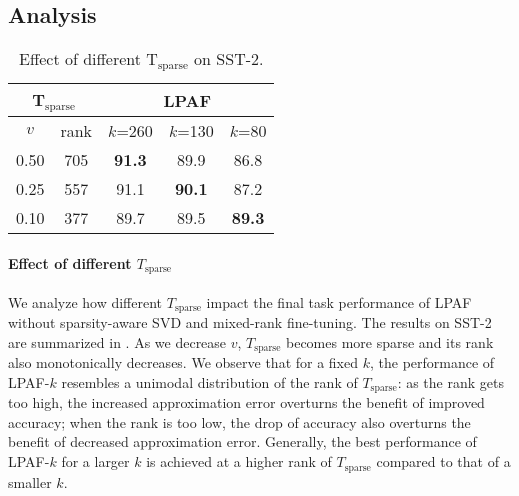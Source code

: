 \subsection{Analysis}
\label{sec:analysis}


\begin{table}[t]
	\centering
	\scriptsize
	\begin{tabular}{ccccc}
		\toprule
		\multicolumn{2}{c|}{T$_{\text{sparse}}$}    & \multicolumn{3}{c}{LPAF}                                                   \\ 
		\midrule
		$v$  & \multicolumn{1}{c|}{rank} & $k$=260 & $k$=130                        & $k$=80                          \\ 
		\midrule
		0.50 & \multicolumn{1}{c|}{705}  & \textbf{91.3}    & 89.9                           & 86.8                            \\
		0.25 & \multicolumn{1}{c|}{557}  & 91.1    & \textbf{90.1} & 87.2                            \\
		0.10 & \multicolumn{1}{c|}{377}  & 89.7    & 89.5                           & \textbf{89.3 } \\ 
		\bottomrule
	\end{tabular}
   \caption{Effect of different T$_\text{sparse}$  on SST-2.}
   \label{table:diffsparse}
\end{table}
\paragraph{Effect of different $T_\text{sparse}$} 	

 We analyze how different $T_\text{sparse}$ impact the final task performance of LPAF without sparsity-aware SVD and mixed-rank fine-tuning.
The results on SST-2 are summarized in . As we decrease $v$, $T_\text{sparse}$ becomes more sparse and its rank also monotonically decreases. We observe that for a fixed $k$, the performance of LPAF-$k$ resembles a unimodal distribution of the rank of $T_\text{sparse}$: as the rank gets too high, the increased approximation error overturns the benefit of improved accuracy; when the rank is too low, the drop of accuracy also overturns the benefit of decreased approximation error. Generally, the best performance of LPAF-$k$ for a larger $k$ is achieved at a higher rank of $T_\text{sparse}$ compared to that of a smaller $k$.


